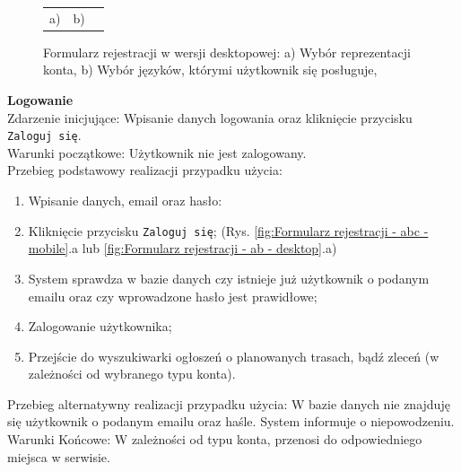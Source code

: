 \begin{figure}[H]
 \centering
  \begin{tabular}{@{}ccc@{}}
  a) & b)\\
  \end{tabular}
 \caption{Formularz rejestracji w wersji desktopowej: a) Wybór reprezentacji konta, b) Wybór języków, którymi użytkownik się posługuje, }
 \label{fig:Formularz rejestracji - ab2 - desktop}
\end{figure}

\textbf{Logowanie} \\
Zdarzenie inicjujące: Wpisanie danych logowania oraz kliknięcie przycisku \texttt{Zaloguj się}. \\
Warunki początkowe: Użytkownik nie jest zalogowany. \\
Przebieg podstawowy realizacji przypadku użycia:
\begin{enumerate}
    \item Wpisanie danych, email oraz hasło:
    \item Kliknięcie przycisku \texttt{Zaloguj się}; (Rys. \ref{fig:Formularz rejestracji - abc - mobile}.a lub \ref{fig:Formularz rejestracji - ab - desktop}.a)
    \item System sprawdza w bazie danych czy istnieje już użytkownik o podanym emailu oraz czy wprowadzone hasło jest prawidłowe;
    \item Zalogowanie użytkownika;
    \item Przejście do wyszukiwarki ogłoszeń o planowanych trasach, bądź zleceń (w zależności od wybranego typu konta).
\end{enumerate}
Przebieg alternatywny realizacji przypadku użycia: W bazie danych nie znajduję się użytkownik o podanym emailu oraz haśle. System informuje o niepowodzeniu. \\
Warunki Końcowe: W zależności od typu konta, przenosi do odpowiedniego miejsca w serwisie.\\

